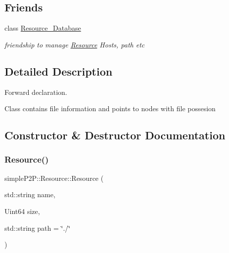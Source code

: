 \subsection*{Friends}
\begin{DoxyCompactItemize}
\item 
\mbox{\label{classsimpleP2P_1_1Resource_a8d5b8c31f7b51293954816c91b76cabd}} 
class \hyperlink{classsimpleP2P_1_1Resource_a8d5b8c31f7b51293954816c91b76cabd}{Resource\+\_\+\+Database}
\begin{DoxyCompactList}\small\item\em friendship to manage \hyperlink{classsimpleP2P_1_1Resource}{Resource} Hosts, path etc \end{DoxyCompactList}\end{DoxyCompactItemize}


\subsection{Detailed Description}
Forward declaration. 

Class contains file information and points to nodes with file possesion 

\subsection{Constructor \& Destructor Documentation}
\mbox{\label{classsimpleP2P_1_1Resource_a0aed54e6cf7d3a5fa2c53fe3b3b57d19}} 
\subsubsection{\texorpdfstring{Resource()}{Resource()}\hspace{0.1cm}{\footnotesize\ttfamily [1/2]}}
{\footnotesize\ttfamily simple\+P2\+P\+::\+Resource\+::\+Resource (\begin{DoxyParamCaption}\item[{std\+::string}]{name,  }\item[{Uint64}]{size,  }\item[{std\+::string}]{path = {\ttfamily \char`\"{}./\char`\"{}} }\end{DoxyParamCaption})}



